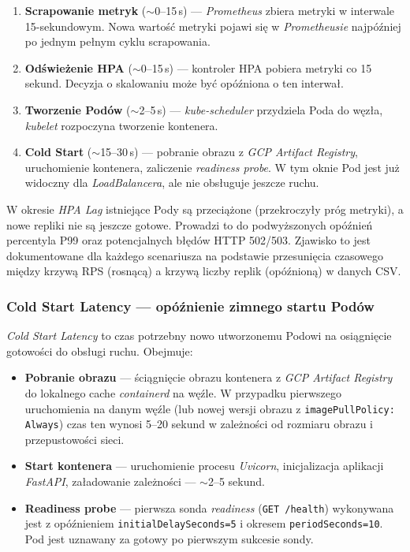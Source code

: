 \begin{enumerate}
  \item \textbf{Scrapowanie metryk} ($\sim$0--15\,s) — \textit{Prometheus} zbiera metryki w interwale 15-sekundowym. Nowa wartość metryki pojawi się w \textit{Prometheusie} najpóźniej po jednym pełnym cyklu scrapowania.
  \item \textbf{Odświeżenie HPA} ($\sim$0--15\,s) — kontroler HPA pobiera metryki co 15 sekund. Decyzja o skalowaniu może być opóźniona o ten interwał.
  \item \textbf{Tworzenie Podów} ($\sim$2--5\,s) — \textit{kube-scheduler} przydziela Poda do węzła, \textit{kubelet} rozpoczyna tworzenie kontenera.
  \item \textbf{Cold Start} ($\sim$15--30\,s) — pobranie obrazu z \textit{GCP Artifact Registry}, uruchomienie kontenera, zaliczenie \textit{readiness probe}. W tym oknie Pod jest już widoczny dla \textit{LoadBalancera}, ale nie obsługuje jeszcze ruchu.
\end{enumerate}

W okresie \textit{HPA Lag} istniejące Pody są przeciążone (przekroczyły próg metryki), a nowe repliki nie są jeszcze gotowe. Prowadzi to do podwyższonych opóźnień percentyla P99 oraz potencjalnych błędów HTTP 502/503. Zjawisko to jest dokumentowane dla każdego scenariusza na podstawie przesunięcia czasowego między krzywą RPS (rosnącą) a krzywą liczby replik (opóźnioną) w danych CSV.

\subsubsection{Cold Start Latency — opóźnienie zimnego startu Podów}

\textit{Cold Start Latency} to czas potrzebny nowo utworzonemu Podowi na osiągnięcie gotowości do obsługi ruchu. Obejmuje:

\begin{itemize}
  \item \textbf{Pobranie obrazu} — ściągnięcie obrazu kontenera z \textit{GCP Artifact Registry} do lokalnego cache \textit{containerd} na węźle. W przypadku pierwszego uruchomienia na danym węźle (lub nowej wersji obrazu z \texttt{imagePullPolicy: Always}) czas ten wynosi 5--20 sekund w zależności od rozmiaru obrazu i przepustowości sieci.
  \item \textbf{Start kontenera} — uruchomienie procesu \textit{Uvicorn}, inicjalizacja aplikacji \textit{FastAPI}, załadowanie zależności — $\sim$2--5 sekund.
  \item \textbf{Readiness probe} — pierwsza sonda \textit{readiness} (\texttt{GET /health}) wykonywana jest z opóźnieniem \texttt{initialDelaySeconds=5} i okresem \texttt{periodSeconds=10}. Pod jest uznawany za gotowy po pierwszym sukcesie sondy.
\end{itemize}


